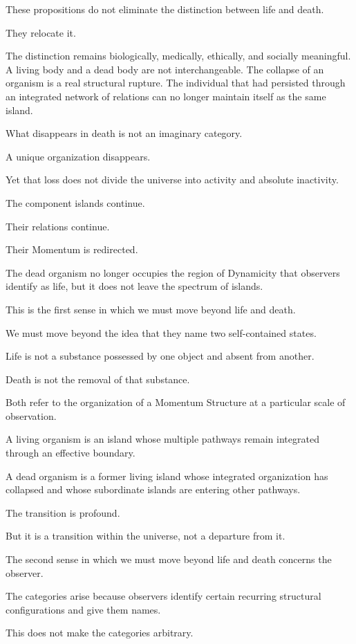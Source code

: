 These propositions do not eliminate the distinction between life and death.

They relocate it.

The distinction remains biologically, medically, ethically, and socially meaningful. A living body and a dead body are not interchangeable. The collapse of an organism is a real structural rupture. The individual that had persisted through an integrated network of relations can no longer maintain itself as the same island.

What disappears in death is not an imaginary category.

A unique organization disappears.

Yet that loss does not divide the universe into activity and absolute inactivity.

The component islands continue.

Their relations continue.

Their Momentum is redirected.

The dead organism no longer occupies the region of Dynamicity that observers identify as life, but it does not leave the spectrum of islands.

This is the first sense in which we must move beyond life and death.

We must move beyond the idea that they name two self-contained states.

Life is not a substance possessed by one object and absent from another.

Death is not the removal of that substance.

Both refer to the organization of a Momentum Structure at a particular scale of observation.

A living organism is an island whose multiple pathways remain integrated through an effective boundary.

A dead organism is a former living island whose integrated organization has collapsed and whose subordinate islands are entering other pathways.

The transition is profound.

But it is a transition within the universe, not a departure from it.

The second sense in which we must move beyond life and death concerns the observer.

The categories arise because observers identify certain recurring structural configurations and give them names.

This does not make the categories arbitrary.

